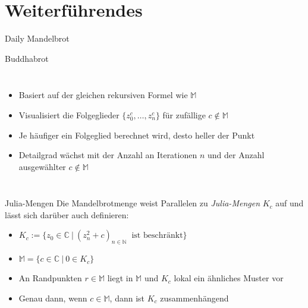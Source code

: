 \EnableTitleSlide
\section{Weiterführendes}

\begin{frame}{Daily Mandelbrot}
    \begin{center}
    \end{center}
\end{frame}

\begin{frame}{Buddhabrot}
    \begin{columns}
            \begin{itemize}
                \item Basiert auf der gleichen rekursiven Formel wie $\mathbb{M}$
                \item Visualisiert die Folgeglieder $\{z^c_0, \dots, z^c_n\}$ für zufällige $c \notin \mathbb{M}$
                \item Je häufiger ein Folgeglied berechnet wird, desto heller der Punkt
                \item Detailgrad wächst mit der Anzahl an Iterationen $n$ und der Anzahl ausgewählter $c \notin \mathbb{M}$
            \end{itemize}
    \end{columns}
\end{frame}

\begin{frame}{Julia-Mengen}
    Die Mandelbrotmenge weist Parallelen zu \textit{Julia-Mengen} $K_c$ auf und lässt sich darüber auch definieren:
    \begin{itemize}
        \item $K_c := \{ z_0 \in \mathbb{C} \ | \ (z^{2}_{n} + c)_{n \in \mathbb{N}} \;\; \textrm{ist beschränkt} \}$
        \item $\mathbb{M}=\{c \in \mathbb{C} \ | \ 0 \in K_c\} $
        \item An Randpunkten $r \in \mathbb{M}$ liegt in $\mathbb{M}$ und $K_c$ lokal ein ähnliches Muster vor
        \item Genau dann, wenn $c\in\mathbb{M}$, dann ist $K_c$ zusammenhängend
    \end{itemize}
\end{frame}